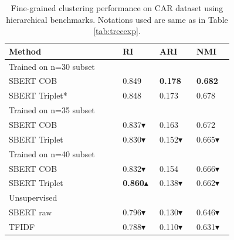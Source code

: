 \documentclass[11pt,a4paper]{article}
\begin{document}
\begin{table}[h]
\begin{small}
\caption{Fine-grained clustering performance on CAR dataset using hierarchical benchmarks. Notations used are same as in Table \ref{tab:trecexp}.}
\label{tab:trecexp2}
\begin{tabular}{p{0.4\linewidth}p{0.12\linewidth}p{0.12\linewidth}p{0.12\linewidth}}
\hline
Method        & RI & ARI & NMI \\ \hline
Trained on n=30 subset&&\\
SBERT COB     & 0.849 & \textbf{0.178} & \textbf{0.682} \\
SBERT Triplet* & 0.848 & 0.173 & 0.678 \\ \hline
Trained on n=35 subset&&\\
SBERT COB     & 0.837$\blacktriangledown$ & 0.163 & 0.672 \\
SBERT Triplet & 0.830$\blacktriangledown$ & 0.152$\blacktriangledown$ & 0.665$\blacktriangledown$ \\ \hline
Trained on n=40 subset&&\\
SBERT COB     & 0.832$\blacktriangledown$ & 0.154 & 0.666$\blacktriangledown$ \\
SBERT Triplet & \textbf{0.860}$\blacktriangle$ & 0.138$\blacktriangledown$ & 0.662$\blacktriangledown$ \\ \hline
Unsupervised&&\\
SBERT raw & 0.796$\blacktriangledown$ & 0.130$\blacktriangledown$ & 0.646$\blacktriangledown$ \\
TFIDF         & 0.788$\blacktriangledown$ & 0.110$\blacktriangledown$ & 0.631$\blacktriangledown$
\end{tabular}
\end{small}
\end{table}
\end{document}
